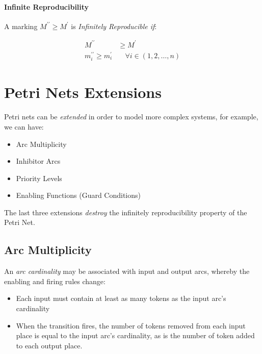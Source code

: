 \documentclass[openright, twoside, twocolumn]{report}
\begin{document}
    \paragraph{Infinite Reproducibility}

    A marking $M^{\prime\prime} \geq  M^\prime$ is \emph{Infinitely Reproducible if}:

    \begin{align}
      M^{\prime\prime}  &\geq  M^\prime\\
      m_i^{\prime\prime}  \geq  m_i^\prime &\quad  \forall  i \in  (1, 2, \ldots, n)
    \end{align}

    \section{Petri Nets Extensions}

    Petri nets can be \emph{extended} in order to model more complex systems, for example, we can have:

    \begin{itemize}
      \item Arc Multiplicity
      \item Inhibitor Arcs
      \item Priority Levels
      \item Enabling Functions (Guard Conditions)
    \end{itemize}

    \begin{remark}
      The last three extensions \emph{destroy} the infinitely reproducibility property of the Petri Net.
    \end{remark}

    \subsection{Arc Multiplicity}

    An \emph{arc cardinality} may be associated with input and output arcs, whereby the enabling and firing
    rules change:

    \begin{itemize}
      \item Each input must contain at least as many tokens as the input arc's cardinality
      \item When the transition fires, the number of tokens removed from each input place is equal to the input arc's cardinality,
      as is the number of token added to each output place.
    \end{itemize}
\end{document}
